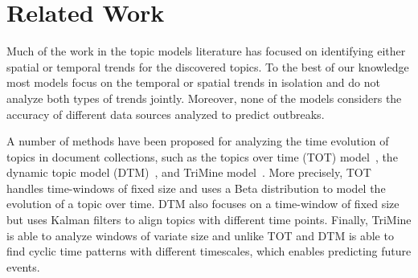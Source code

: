 \documentclass[twoside,leqno,twocolumn]{article}
\newcommand{\fullmodel}{{{\sf SourceSeer}}\xspace}
\newcommand{\locationmodel}{{\sf LocSeer}\xspace}
\begin{document}
%
\section{Related Work}
\label{sec:related_work}
Much of the work in the topic models literature has focused on identifying either spatial or temporal trends for the discovered topics. To the best of our knowledge most models focus on the temporal or spatial trends in isolation and do not analyze both types of trends jointly.  Moreover, none of the models considers the accuracy of different data sources analyzed to predict outbreaks.


A number of methods have been proposed for analyzing the time evolution of topics in document collections, such as the topics over time (TOT) model~\cite{wang:2006}, the dynamic topic model (DTM)~\cite{blei:2006}, and TriMine model~\cite{matsubara:2012}.  More precisely, TOT handles time-windows of fixed size and uses a Beta distribution to model the evolution of a topic over time. DTM  also focuses on a time-window of fixed size but uses Kalman filters to align topics with different time points. Finally, TriMine is able to analyze windows of variate size and unlike TOT and DTM is able to find cyclic time patterns with different timescales, which enables predicting future events.
\end{document}
